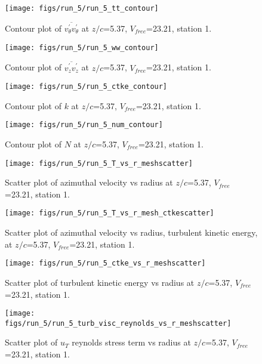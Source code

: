 \begin{figure}[H]
\centering
\texttt{[image: figs/run\_5/run\_5\_tt\_contour]}
\caption{Contour plot of $\overline{v_{\theta}^{\prime} v_{\theta}^{\prime}}$ at $z/c$=5.37, $V_{free}$=23.21, station 1.}
\end{figure}


\begin{figure}[H]
\centering
\texttt{[image: figs/run\_5/run\_5\_ww\_contour]}
\caption{Contour plot of $\overline{v_{z}^{\prime} v_{z}^{\prime}}$ at $z/c$=5.37, $V_{free}$=23.21, station 1.}
\end{figure}


\begin{figure}[H]
\centering
\texttt{[image: figs/run\_5/run\_5\_ctke\_contour]}
\caption{Contour plot of $k$ at $z/c$=5.37, $V_{free}$=23.21, station 1.}
\end{figure}


\begin{figure}[H]
\centering
\texttt{[image: figs/run\_5/run\_5\_num\_contour]}
\caption{Contour plot of $N$ at $z/c$=5.37, $V_{free}$=23.21, station 1.}
\end{figure}


\begin{figure}[H]
\centering
\texttt{[image: figs/run\_5/run\_5\_T\_vs\_r\_meshscatter]}
\caption{Scatter plot of azimuthal velocity vs radius at $z/c$=5.37, $V_{free}$=23.21, station 1.}
\end{figure}


\begin{figure}[H]
\centering
\texttt{[image: figs/run\_5/run\_5\_T\_vs\_r\_mesh\_ctkescatter]}
\caption{Scatter plot of azimuthal velocity vs radius, turbulent kinetic energy, at $z/c$=5.37, $V_{free}$=23.21, station 1.}
\end{figure}


\begin{figure}[H]
\centering
\texttt{[image: figs/run\_5/run\_5\_ctke\_vs\_r\_meshscatter]}
\caption{Scatter plot of turbulent kinetic energy vs radius at $z/c$=5.37, $V_{free}$=23.21, station 1.}
\end{figure}


\begin{figure}[H]
\centering
\texttt{[image: figs/run\_5/run\_5\_turb\_visc\_reynolds\_vs\_r\_meshscatter]}
\caption{Scatter plot of $
u_T$ reynolds stress term vs radius at $z/c$=5.37, $V_{free}$=23.21, station 1.}
\end{figure}


